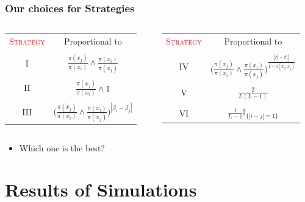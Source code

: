 \documentclass[xetex]{beamer}
\begin{document}
	\begin{frame}[t]\frametitle{Our choices for Strategies}
	    
	   	\begin{columns} 
	    	\begin{column}[t]{.5\textwidth}	
				\begin{table}[htbp]
					\begin{tabular}{cc}
					\textcolor{red}{\textsc{Strategy}} & Proportional to \\ 
					&\\
					I &  $\frac{\pi (x_j)}{\pi( x_i )} \wedge \frac{\pi (x_i)}{\pi( x_j )}$ \\ 
					&\\
					II & $\frac{\pi (x_j)}{\pi( x_i )} \wedge 1$ \\ 
					&\\
					III & $\Big( \frac{\pi (x_j)}{\pi( x_i )} \wedge 
								\frac{\pi (	x_i)}{\pi( x_j )} \Big)^{|\beta_i - \beta_j|}$
					\end{tabular}
				\end{table}
			\end{column}
			\begin{column}[t]{.5\textwidth}			
				\begin{table}[htbp]
					\begin{tabular}{cc}
					\textcolor{red}{\textsc{Strategy}} & Proportional to \\ 
					&\\
					IV & $\Big( \frac{\pi (x_j)}{\pi( x_i )} \wedge \frac{\pi (x_i)}{\pi( x_j )} \Big)^\frac{|\beta_i - \beta_j|}{1 + \rho(x_i, x_j)}$ \\ 
					&\\
					V & $\frac{2}{L (L - 1)}$ \\ 
					&\\
					VI & $\frac{1}{L - 1} \mathbb{I}_{\{|i-j|=1\}}$ 
					\end{tabular}
				\end{table}
			\end{column}
		\end{columns}	

		\begin{itemize}
			\item Which one is the best?
		\end{itemize}
	\end{frame}


\section{Results of Simulations}
\end{document}
